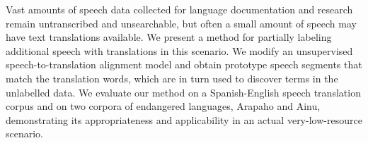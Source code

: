 Vast amounts of speech data collected for language documentation and research remain untranscribed and unsearchable, but often a small amount of speech may have text translations available. We present a method for partially labeling additional speech with translations in this scenario. We modify an unsupervised speech-to-translation alignment model and obtain prototype speech segments that match the translation words, which are in turn used to discover terms in the unlabelled data. We evaluate our method on a Spanish-English speech translation corpus and on two corpora of endangered languages, Arapaho and Ainu, demonstrating its appropriateness and applicability in an actual very-low-resource scenario.
